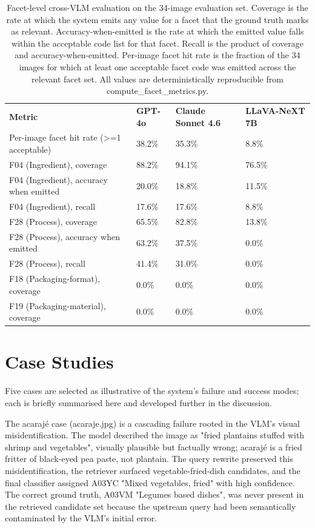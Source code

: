 \begin{longtable}[]{@{}llll@{}}
\caption{Facet-level cross-VLM evaluation on the 34-image evaluation set. Coverage is the rate at which the system emits any value for a facet that the ground truth marks as relevant. Accuracy-when-emitted is the rate at which the emitted value falls within the acceptable code list for that facet. Recall is the product of coverage and accuracy-when-emitted. Per-image facet hit rate is the fraction of the 34 images for which at least one acceptable facet code was emitted across the relevant facet set. All values are deterministically reproducible from compute\_facet\_metrics.py.}\label{tab:facet-eval}\\
\toprule
\endhead
\textbf{Metric} & \textbf{GPT-4o} & \textbf{Claude Sonnet 4.6} & \textbf{LLaVA-NeXT 7B}\tabularnewline
Per-image facet hit rate (\textgreater=1 acceptable) & 38.2\% & 35.3\% & 8.8\%\tabularnewline
F04 (Ingredient), coverage & 88.2\% & 94.1\% & 76.5\%\tabularnewline
F04 (Ingredient), accuracy when emitted & 20.0\% & 18.8\% & 11.5\%\tabularnewline
F04 (Ingredient), recall & 17.6\% & 17.6\% & 8.8\%\tabularnewline
F28 (Process), coverage & 65.5\% & 82.8\% & 13.8\%\tabularnewline
F28 (Process), accuracy when emitted & 63.2\% & 37.5\% & 0.0\%\tabularnewline
F28 (Process), recall & 41.4\% & 31.0\% & 0.0\%\tabularnewline
F18 (Packaging-format), coverage & 0.0\% & 0.0\% & 0.0\%\tabularnewline
F19 (Packaging-material), coverage & 0.0\% & 0.0\% & 0.0\%\tabularnewline
\bottomrule
\end{longtable}


\hypertarget{case-studies}{%
\section{Case Studies}\label{case-studies}}

Five cases are selected as illustrative of the system's failure and success modes; each is briefly summarised here and developed further in the discussion.

The acarajé case (acaraje.jpg) is a cascading failure rooted in the VLM's visual misidentification. The model described the image as "fried plantains stuffed with shrimp and vegetables", visually plausible but factually wrong; acarajé is a fried fritter of black-eyed pea paste, not plantain. The query rewrite preserved this misidentification, the retriever surfaced vegetable-fried-dish candidates, and the final classifier assigned A03YC "Mixed vegetables, fried" with high confidence. The correct ground truth, A03VM "Legumes based dishes", was never present in the retrieved candidate set because the upstream query had been semantically contaminated by the VLM's initial error.

